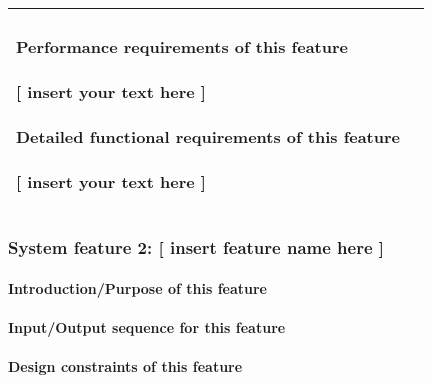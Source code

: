 \documentclass[letterpaper, 10pt, draftclsnofoot, onecolumn]{IEEEtran}
\begin{document}
\begin{flushleft}
\begin{supertabular}{|m{3.17056in}|m{3.1740599in}|}
\paragraph[Performance requirements of this
feature]{\rmfamily\bfseries\color{black}
Performance requirements of this feature}
{\color{black} [ insert your text here ]}

\paragraph[Detailed functional requirements of this
feature]{\rmfamily\bfseries\color{black}
Detailed functional requirements of this feature}




\paragraph[]{\rmfamily\bfseries\color{black} }

\color{black} [ insert your text here ]\\\hline
\end{supertabular}
\end{flushleft}

\bigskip

\subsubsection[System feature 2: [ insert feature name here
{]}]{\rmfamily\bfseries\color{black} System
feature 2: [ insert feature name here ]}
\paragraph[Introduction/Purpose of this feature]
{\rmfamily\bfseries\color{black}Introduction/Purpose of this feature}

\paragraph[Input/Output sequence for this feature]{\rmfamily\bfseries\color{black}Input/Output sequence for this feature}

\paragraph[Design constraints of this
feature]{\rmfamily\bfseries\color{black} Design
constraints of this feature}
\end{document}
